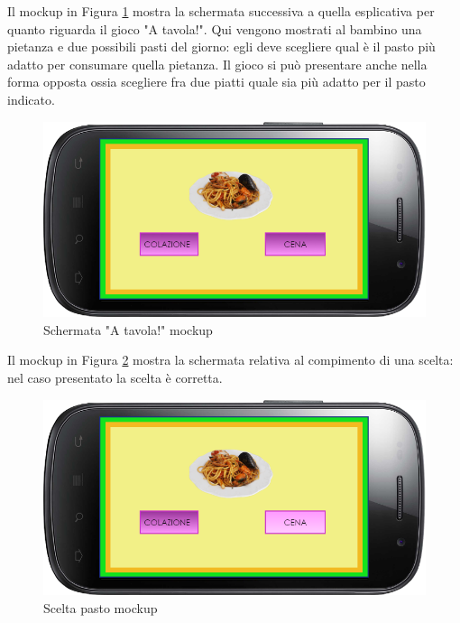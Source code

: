 Il mockup in Figura \ref{fig:Schermata "A tavola!"} mostra la schermata successiva a quella esplicativa per quanto riguarda il gioco "A tavola!". Qui vengono mostrati al bambino una pietanza e due possibili pasti del giorno: egli deve scegliere qual è il pasto più adatto per consumare quella pietanza. Il gioco si può presentare anche nella forma opposta ossia scegliere fra due piatti quale sia più adatto per il pasto indicato.
\vspace{70pt}
\begin{figure}[htbp]
\centering
\includegraphics[width=\textwidth]{Images/Mockup/atavola}
\caption{Schermata "A tavola!" mockup}
\label{fig:Schermata "A tavola!"}
\end{figure}
\clearpage

Il mockup in Figura \ref{fig:Scelta "A tavola!"} mostra la schermata relativa al compimento di una scelta: nel caso presentato la scelta è corretta.
\vspace{70pt}
\begin{figure}[htbp]
\centering
\includegraphics[width=\textwidth]{Images/Mockup/atavolascelta}
\caption{Scelta pasto mockup}
\label{fig:Scelta "A tavola!"}
\end{figure}
\clearpage